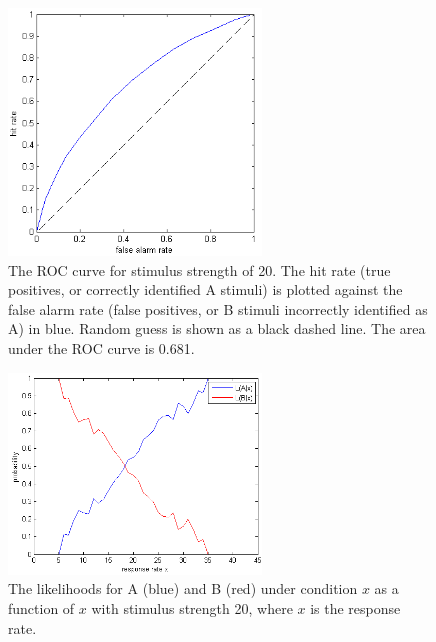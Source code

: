 \documentclass{scrartcl}
\begin{document}
\begin{figure}
\centering
\includegraphics[width=0.6\textwidth]{../pics/roc}
\caption{The ROC curve for stimulus strength of 20. The hit rate (true positives, or correctly identified A stimuli) is plotted against the false alarm rate (false positives, or B stimuli incorrectly identified as A) in blue. Random guess is shown as a black dashed line. The area under the ROC curve is 0.681.}
\label{roc}
\end{figure}

\begin{figure}
\centering
\includegraphics[width=0.6\textwidth]{../pics/conditional}
\caption{The likelihoods for A (blue) and B (red) under condition $x$ as a function of $x$ with stimulus strength 20, where $x$ is the response rate.}
\label{conditional}
\end{figure}

\end{document}
